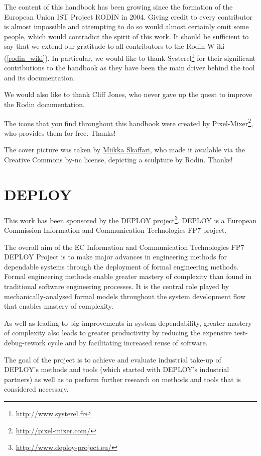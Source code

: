 \documentclass[12pt]{book}
\begin{document}
The content of this handbook has been growing since the formation of the European Union IST Project RODIN in 2004.  Giving credit to every contributor is almost impossible and attempting to do so would almost certainly omit some people, which would contradict the spirit of this work.  It should be sufficient to say that we extend our gratitude to all contributors to the Rodin W
iki (\ref{rodin_wiki}). In particular, we would like to thank Systerel\footnote{\url{http://www.systerel.fr}} for their significant contributions to the handbook as they have been the main driver behind the tool and its documentation.

We would also like to thank Cliff Jones, who never gave up the quest to improve the Rodin documentation.

The icons that you find throughout this handbook were created by Pixel-Mixer\footnote{\url{http://pixel-mixer.com/}}, who provides them for free.  Thanks!

The cover picture was taken by \href{http://www.skaffari.fi/}{Miikka Skaffari}, who made it available via the Creative Commons by-nc license, depicting a sculpture by Rodin.  Thanks!

\section{DEPLOY}
\label{deploy}

This work has been sponsored by the DEPLOY project\footnote{\url{http://www.deploy-project.eu/}}.  DEPLOY is a European Commission Information and Communication Technologies FP7 project.

The overall aim of the EC Information and Communication Technologies FP7 DEPLOY Project is to make major advances in engineering methods for dependable systems through the deployment of formal engineering methods. Formal engineering methods enable greater mastery of complexity than found in traditional software engineering processes. It is the central role played by mechanically-analysed formal models throughout the system development flow that enables mastery of complexity.

As well as leading to big improvements in system dependability, greater mastery of complexity also leads to greater productivity by reducing the expensive test-debug-rework cycle and by facilitating increased reuse of software.

The goal of the project is to achieve and evaluate industrial take-up of DEPLOY's methods and tools (which started with DEPLOY's industrial partners) as well as to perform further research on methods and tools that is considered necessary.



% 







\clearpage
{}
{} 
\printindex
\end{document}
